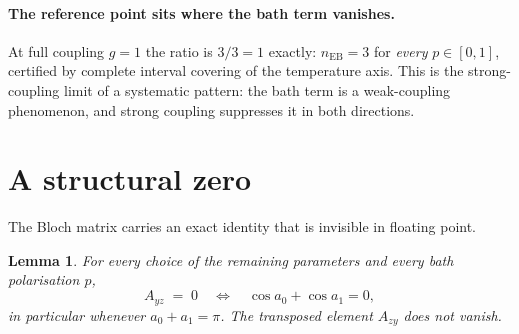 \documentclass[11pt,a4paper]{article}
\newtheorem{lemma}[theorem]{Lemma}
\theoremstyle{definition}
\theoremstyle{remark}
\newcommand{\nEB}{n_{\mathrm{EB}}}
\begin{document}
\paragraph{The reference point sits where the bath term vanishes.} At full coupling $g=1$ the ratio is $3/3 = 1$ exactly: $\nEB = 3$ for \emph{every} $p \in [0,1]$, certified by complete interval covering of the temperature axis. This is the strong-coupling limit of a systematic pattern: the bath term is a weak-coupling phenomenon, and strong coupling suppresses it in both directions.

\section{A structural zero}\label{sec:structuralzero}

The Bloch matrix carries an exact identity that is invisible in floating point.

\begin{lemma}\label{lem:structuralzero}
For every choice of the remaining parameters and every bath polarisation $p$,
\[
  A_{yz} \;=\; 0 \quad\Longleftrightarrow\quad \cos a_0 + \cos a_1 = 0,
\]
in particular whenever $a_0 + a_1 = \pi$. The transposed element $A_{zy}$ does not vanish.
\end{lemma}
\end{document}

